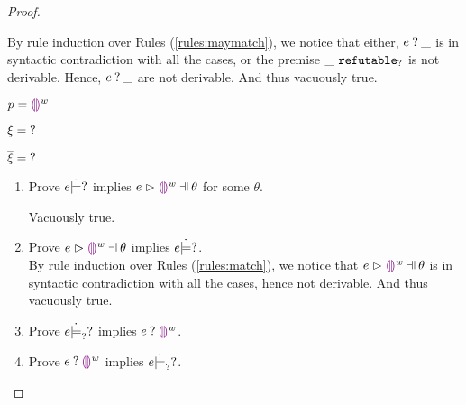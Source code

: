 \begin{proof}
\begin{byCases}
\begin{enumerate}
        By rule induction over Rules (\ref{rules:maymatch}), we notice that either, $e \mathbin{?} \_$ is in syntactic contradiction with all the cases, or the premise $\_ ~\mathtt{refutable}_?$ is not derivable. Hence, $e \mathbin{?} \_$ are not derivable. And thus vacuously true.
    \end{enumerate}
    
\item[\text{(\ref{rule:PTEHole})}]
    \begin{pfsteps*}
    \item $p=\textcolor{violet}{\llparenthesis}\textcolor{violet}{\rrparenthesis}^{w}$ 
    \item $\xi=\mathtt{?}$ 
    \item $\overline{\xi}=\mathtt{?}$ 
    \end{pfsteps*}
    \begin{enumerate}
    \item Prove $e \dot{\models} \mathtt{?}$ implies $\hpatmatch{e}{\heholep{w}}{\theta}$ for some $\theta$.
        Vacuously true.
    \item Prove $\hpatmatch{e}{\heholep{w}}{\theta}$ implies $e \dot{\models} \mathtt{?}$.\\
        By rule induction over Rules (\ref{rules:match}), we notice that $\hpatmatch{e}{\heholep{w}}{\theta}$ is in syntactic contradiction with all the cases, hence not derivable. And thus vacuously true.
    \item Prove $e \dot{\models}_{?} \mathtt{?}$ implies $e \mathbin{?} \textcolor{violet}{\llparenthesis}\textcolor{violet}{\rrparenthesis}^{w}$.
    \item Prove $e \mathbin{?} \textcolor{violet}{\llparenthesis}\textcolor{violet}{\rrparenthesis}^{w}$ implies $e \dot{\models}_{?} \mathtt{?}$.
    \end{enumerate}


\end{byCases}
\end{proof}
